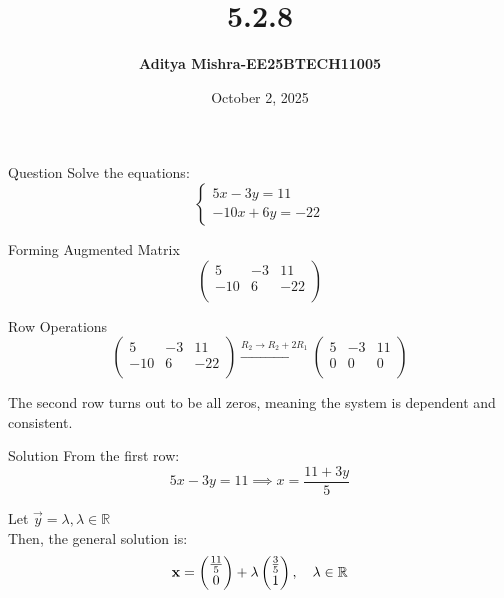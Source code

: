 \documentclass{beamer}
\title{\textbf{5.2.8}}
\author{\textbf{Aditya Mishra-EE25BTECH11005}}
\date{October 2, 2025}
\begin{document}
\begin{frame}
\titlepage
\end{frame}

\begin{frame}{Question}
Solve the equations:
\[
\begin{cases}
5x - 3y = 11 \\
-10x + 6y = -22
\end{cases}
\]
\end{frame}

\begin{frame}{Forming Augmented Matrix}
\[
\left(
\begin{array}{cc|c}
5 & -3 & 11 \\
-10 & 6 & -22 \\
\end{array}
\right)
\]
\end{frame}

\begin{frame}{Row Operations}
\[
\left(
\begin{array}{cc|c}
5 & -3 & 11 \\
-10 & 6 & -22 \\
\end{array}
\right)
\xrightarrow{R_2 \rightarrow R_2 + 2R_1}
\left(
\begin{array}{cc|c}
5 & -3 & 11 \\
0 & 0 & 0 \\
\end{array}
\right)
\]

The second row turns out to be all zeros, meaning the system is dependent and consistent.
\end{frame}

\begin{frame}{Solution}
From the first row:
\[
5x - 3y = 11 \implies x = \frac{11 + 3y}{5}
\]

Let \(\vec{y} = \lambda, \lambda \in \mathbb{R}\) \\
Then, the general solution is:
\[
\mathbf{x} = \begin{pmatrix}\frac{11}{5} \\ 0\end{pmatrix} + \lambda \begin{pmatrix}\frac{3}{5} \\ 1\end{pmatrix}, \quad \lambda \in \mathbb{R}
\]
\end{frame}
\end{document}
